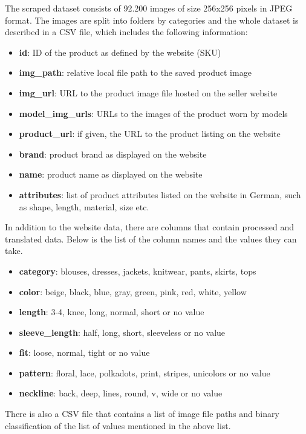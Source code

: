\documentclass{article}
\begin{document}
The scraped dataset consists of 92.200 images of size 256x256 pixels in JPEG format. The images are split into folders by categories and the whole dataset is described in a CSV file, which includes the following information:
\begin{itemize}
\item \textbf{id}: ID of the product as defined by the website (SKU)
\item \textbf{img\_path}: relative local file path to the saved product image
\item \textbf{img\_url}: URL to the product image file hosted on the seller website
\item \textbf{model\_img\_urls}: URLs to the images of the product worn by models
\item \textbf{product\_url}: if given, the URL to the product listing on the website
\item \textbf{brand}: product brand as displayed on the website
\item \textbf{name}: product name as displayed on the website
\item \textbf{attributes}: list of product attributes listed on the website in German, such as shape, length, material, size etc.
\end{itemize}

In addition to the website data, there are columns that contain processed and translated data. Below is the list of the column names and the values they can take.
\begin{itemize}
\item \textbf{category}: blouses, dresses, jackets, knitwear, pants, skirts, tops
\item \textbf{color}: beige, black, blue, gray, green, pink, red, white, yellow
\item \textbf{length}: 3-4, knee, long, normal, short or no value
\item \textbf{sleeve\_length}: half, long, short, sleeveless or no value
\item \textbf{fit}: loose, normal, tight or no value
\item \textbf{pattern}: floral, lace, polkadots, print, stripes, unicolors or no value
\item \textbf{neckline}: back, deep, lines, round, v, wide or no value
\end{itemize}

There is also a CSV file that contains a list of image file paths and binary classification of the list of values mentioned in the above list.
\end{document}
